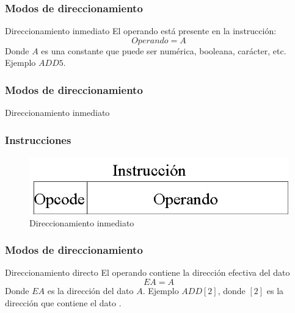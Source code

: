 \documentclass{beamer}
\begin{document}
\begin{frame}
	\frametitle{Modos de direccionamiento}
	\begin{block}{Direccionamiento inmediato}
		El operando está presente en la instrucción:
		\begin{equation}
			Operando = A
		\end{equation}
		Donde $A$ es una constante que puede ser numérica, booleana, carácter, etc. Ejemplo $ADD 5$.				
	\end{block}		 		
\end{frame}

\begin{frame}
	\frametitle{Modos de direccionamiento}
	\begin{block}{Direccionamiento inmediato}
	\frametitle{Instrucciones}
	\begin{figure}[H]
	\centering
	\includegraphics[scale=0.4]{imagenes/inmediato.jpg}
	\caption{Direccionamiento inmediato}
	\end{figure}			
	\end{block}		 		
\end{frame}

\begin{frame}
	\frametitle{Modos de direccionamiento}
	\begin{block}{Direccionamiento directo}
		El operando contiene la dirección efectiva del dato
		\begin{equation}
			EA = A
		\end{equation}
		Donde $EA$ es la dirección del dato $A$. Ejemplo $ADD [2]$, donde $[2]$ es la dirección que contiene el dato .				
	\end{block}		 		
\end{frame}
\end{document}
